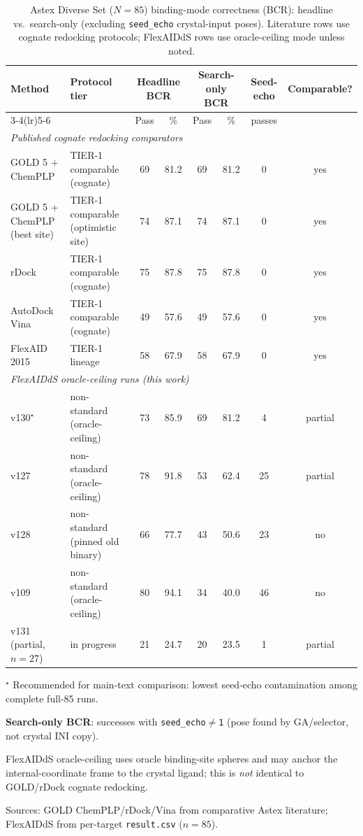 \begin{table}[t]
\centering
\caption{Astex Diverse Set ($N{=}85$) binding-mode correctness (BCR): headline vs.\ search-only (excluding \texttt{seed\_echo} crystal-input poses). Literature rows use cognate redocking protocols; FlexAIDdS rows use oracle-ceiling mode unless noted.}
\label{tab:astex-diverse-bcr}
\small
\begin{tabular}{@{}llcccccc@{}}
\toprule
\textbf{Method} & \textbf{Protocol tier} &
\multicolumn{2}{c}{\textbf{Headline BCR}} &
\multicolumn{2}{c}{\textbf{Search-only BCR}} &
\textbf{Seed-echo} & \textbf{Comparable?} \\
\cmidrule(lr){3-4}\cmidrule(lr){5-6}
 & & Pass & \% & Pass & \% & passes & \\
\midrule
\multicolumn{8}{l}{\textit{Published cognate redocking comparators}} \\
GOLD 5 + ChemPLP & TIER-1 comparable (cognate) & 69 & 81.2 & 69 & 81.2 & 0 & yes \\
GOLD 5 + ChemPLP (best site) & TIER-1 comparable (optimistic site) & 74 & 87.1 & 74 & 87.1 & 0 & yes \\
rDock & TIER-1 comparable (cognate) & 75 & 87.8 & 75 & 87.8 & 0 & yes \\
AutoDock Vina & TIER-1 comparable (cognate) & 49 & 57.6 & 49 & 57.6 & 0 & yes \\
FlexAID 2015 & TIER-1 lineage & 58 & 67.9 & 58 & 67.9 & 0 & yes \\
\midrule
\multicolumn{8}{l}{\textit{FlexAIDdS oracle-ceiling runs (this work)}} \\
v130$^\star$ & non-standard (oracle-ceiling) & 73 & 85.9 & 69 & 81.2 & 4 & partial \\
v127 & non-standard (oracle-ceiling) & 78 & 91.8 & 53 & 62.4 & 25 & partial \\
v128 & non-standard (pinned old binary) & 66 & 77.7 & 43 & 50.6 & 23 & no \\
v109 & non-standard (oracle-ceiling) & 80 & 94.1 & 34 & 40.0 & 46 & no \\
v131 (partial, $n=27$) & in progress & 21 & 24.7 & 20 & 23.5 & 1 & partial \\
\bottomrule
\end{tabular}
\begin{tablenotes}\small
\item $^\star$ Recommended for main-text comparison: lowest seed-echo contamination among complete full-85 runs.
\item \textbf{Search-only BCR}: successes with \texttt{seed\_echo}$\neq$\texttt{1} (pose found by GA/selector, not crystal INI copy).
\item FlexAIDdS oracle-ceiling uses oracle binding-site spheres and may anchor the internal-coordinate frame to the crystal ligand; this is \emph{not} identical to GOLD/rDock cognate redocking.
\item Sources: GOLD ChemPLP/rDock/Vina from comparative Astex literature; FlexAIDdS from per-target \texttt{result.csv} ($n{=}85$).
\end{tablenotes}
\end{table}

